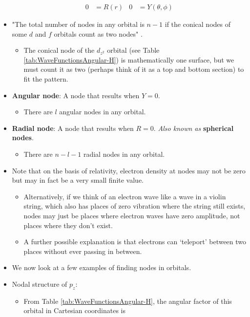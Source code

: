 \documentclass[../main.tex]{subfiles}
\begin{document}
\begin{itemize}
\begin{align*}
        0 &= R(r)&
            0 &= Y(\theta,\phi)
    \end{align*}
    \item "The total number of nodes in any orbital is $n-1$ if the conical nodes of some $d$ and $f$ orbitals count as two nodes" \parencite[23]{bib:MiesslerFischerTarr}.
    \begin{itemize}
        \item The conical node of the $d_{z^2}$ orbital (see Table \ref{tab:WaveFunctionsAngular-H}) is mathematically one surface, but we must count it as two (perhaps think of it as a top and bottom section) to fit the pattern.
    \end{itemize}
    \item \textbf{Angular node}: A node that results when $Y=0$.
    \begin{itemize}
        \item There are $l$ angular nodes in any orbital.
    \end{itemize}
    \item \textbf{Radial node}: A node that results when $R=0$. \emph{Also known as} \textbf{spherical nodes}.
    \begin{itemize}
        \item There are $n-l-1$ radial nodes in any orbital.
    \end{itemize}
    \item Note that on the basis of relativity, electron density at nodes may not be zero but may in fact be a very small finite value.
    \begin{itemize}
        \item Alternatively, if we think of an electron wave like a wave in a violin string, which also has places of zero vibration where the string still exists, nodes may just be places where electron waves have zero amplitude, not places where they don't exist.
        \item A further possible explanation is that electrons can `teleport' between two places without ever passing in between.
    \end{itemize}
    \item We now look at a few examples of finding nodes in orbitals.
    \item Nodal structure of $p_z$:
    \begin{itemize}
        \item From Table \ref{tab:WaveFunctionsAngular-H}, the angular factor of this orbital in Cartesian coordinates is
        \begin{equation*}

\end{equation*}
\end{itemize}
\end{itemize}
\end{document}
